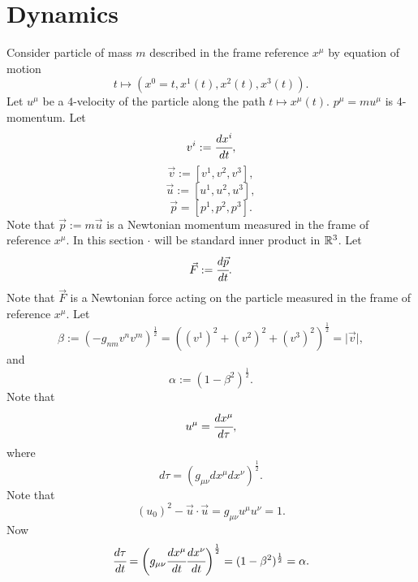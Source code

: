 \documentclass[main.tex]{subfiles}
\begin{document}
\section{Dynamics}
Consider particle of mass $m$ described in the frame reference $x^\mu$ by equation of motion
\begin{equation}
t\mapsto(x^0=t, x^1(t), x^2(t), x^3(t)).
\end{equation}
Let $u^\mu$ be a $4$-velocity of the particle along the path $t\mapsto x^\mu(t)$. $p^\mu = mu^\mu$ is $4$-momentum. 
Let 
\begin{equation}
v^i := \cfrac{dx^i}{dt},
\end{equation}
\begin{equation}
\vec{v}:=[v^1, v^2, v^3],
\end{equation}
\begin{equation}
\vec{u}:=[u^1, u^2, u^3],
\end{equation}
\begin{equation}
\vec{p} = [p^1, p^2, p^3].
\end{equation}
Note that $\vec{p} := m\vec{u}$ is a Newtonian momentum measured in the frame of reference $x^\mu$. 
In this section $\cdot$ will be standard inner product in $\mathbb{R}^3$.
Let
\begin{equation}
\vec{F} := \cfrac{d\vec{p}}{dt}.
\end{equation}
Note that $\vec{F}$ is a Newtonian force acting on the particle measured in the frame of reference $x^\mu$.
Let
\begin{equation}
\beta := (-g_{nm}v^nv^m)^\frac{1}{2} = ((v^1)^2 + (v^2)^2 + (v^3)^2)^{\frac{1}{2}} = \vert \vec{v} \vert,
\end{equation}
and
\begin{equation}
\alpha := (1-\beta^2)^\frac{1}{2}.
\end{equation}
Note that
\begin{equation}
u^\mu = \cfrac{dx^\mu}{d\tau},
\end{equation}
where 
\begin{equation}
d\tau = (g_{\mu\nu} dx^\mu dx^\nu)^{\frac{1}{2}}.
\end{equation}
Note that 
\begin{equation}
\label{world-vec-equation}
(u_0)^2 - \vec{u}\cdot\vec{u} = g_{\mu\nu} u^\mu u^\nu = 1. 
\end{equation}
Now
\begin{equation}
\cfrac{d\tau}{dt} = \bigg(g_{\mu\nu} \cfrac{dx^\mu}{dt} \cfrac{dx^\nu}{dt}\bigg)^{\frac{1}{2}} = (1-\beta^2)^{\frac{1}{2}} = \alpha.
\end{equation}
\end{document}
